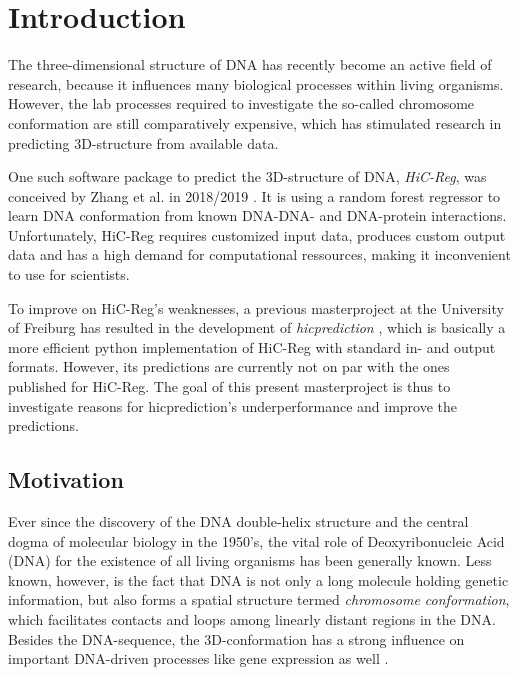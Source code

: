 \section{Introduction} \label{sec:intro}
The three-dimensional structure of DNA has recently become an active field of research,
because it influences many biological processes within living organisms.
However, the lab processes required to investigate the so-called chromosome conformation
are still comparatively expensive, which has stimulated research in predicting 
3D-structure from available data.

One such software package to predict the 3D-structure of DNA, \emph{HiC-Reg}, was conceived by Zhang et al. in 2018/2019 \cite{Zhang2018,Zhang2019}.
It is using a random forest regressor to learn DNA conformation from known DNA-DNA- and DNA-protein interactions. 
Unfortunately, HiC-Reg requires customized input data, produces custom output data
and has a high demand for computational ressources, making it inconvenient to use for scientists.

To improve on HiC-Reg's weaknesses, a previous masterproject at the University of Freiburg 
has resulted in the development of \emph{hicprediction} \cite{Bajorat2019}, 
which is basically a more efficient python implementation of HiC-Reg with standard in- and output formats.
However, its predictions are currently not on par with the ones published for HiC-Reg.
The goal of this present masterproject is thus to investigate reasons for hicprediction's underperformance
and improve the predictions.

\subsection{Motivation}
Ever since the discovery of the DNA double-helix structure \cite{Watson1953} and the central dogma of molecular biology \cite{Crick1958} in the 1950's,
the vital role of Deoxyribonucleic Acid (DNA) for the existence of all living organisms has been generally known.
Less known, however, is the fact that DNA is not only a long molecule holding genetic information, 
but also forms a spatial structure termed \emph{chromosome conformation}, 
which facilitates contacts and loops among linearly distant regions in the DNA. 
Besides the DNA-sequence, the 3D-conformation has a strong influence on important DNA-driven processes
like gene expression as well \cite{Pombo2015,Bonev2016}.

